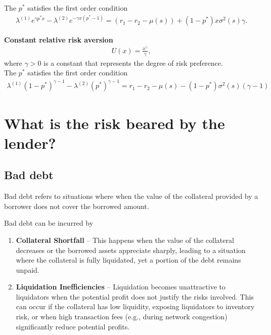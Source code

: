 \documentclass{article} %
\theoremstyle{plain}
\theoremstyle{definition} %
\begin{document}
The $p^*$ satisfies the first order condition
\begin{align*}
  \lambda^{(1)} e^{\gamma p^*x}
  - \lambda^{(2)} e^{-\gamma x (p^*-1)} = (r_1 - r_2 - \mu(s)) + (1-p^*)x\sigma^2(s) \gamma.  
\end{align*}

\textbf{Constant relative risk aversion}
\begin{align*}
  U(x) = \frac{x^\gamma}{\gamma}, 
\end{align*}
where $\gamma > 0$ is a constant that represents the degree of risk preference. \\

The $p^*$ satisfies the first order condition
\begin{align*}
  \lambda^{(1)}(1-p^*)^{\gamma-1} - \lambda^{(2)}(p^*)^{\gamma-1}=r_1-r_2 - \mu(s) - (1-p^*)\sigma^2(s) (\gamma - 1) 
\end{align*}


\section{What is the risk beared by the lender?}
\subsection{Bad debt}
Bad debt refers to situations where when the value of the collateral provided by a borrower does not cover the borrowed amount.
 
 Bad debt can be incurred by 
 \begin{enumerate}
  \item \textbf{Collateral Shortfall} -- This happens when the value of the collateral decreases or the borrowed assets appreciate sharply, leading to a situation where the collateral is fully liquidated, yet a portion of the debt remains unpaid.
  \item \textbf{Liquidation Inefficiencies} -- Liquidation becomes unattractive to liquidators when the potential profit does not justify the risks involved. 
  This can occur if the collateral has low liquidity, exposing liquidators to inventory risk, or when high transaction fees (e.g., during network congestion) significantly reduce potential profits.
\end{enumerate}

\end{document}
